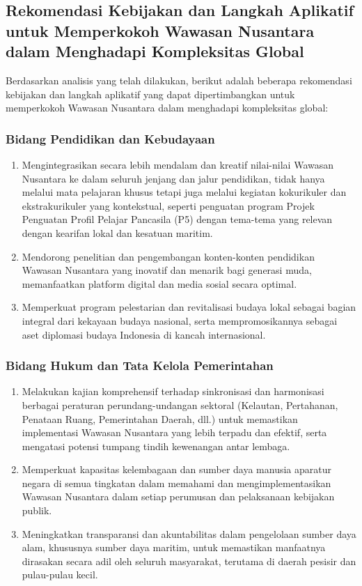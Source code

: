 \documentclass[12pt, a4paper]{article}
\begin{document}
\subsection*{Rekomendasi Kebijakan dan Langkah Aplikatif untuk Memperkokoh Wawasan Nusantara dalam Menghadapi Kompleksitas Global}
Berdasarkan analisis yang telah dilakukan, berikut adalah beberapa rekomendasi kebijakan dan langkah aplikatif yang dapat dipertimbangkan untuk memperkokoh Wawasan Nusantara dalam menghadapi kompleksitas global:
\subsubsection*{Bidang Pendidikan dan Kebudayaan}
\begin{enumerate}
  \item Mengintegrasikan secara lebih mendalam dan kreatif nilai-nilai Wawasan Nusantara ke dalam seluruh jenjang dan jalur pendidikan, tidak hanya melalui mata pelajaran khusus tetapi juga melalui kegiatan kokurikuler dan ekstrakurikuler yang kontekstual, seperti penguatan program Projek Penguatan Profil Pelajar Pancasila (P5) dengan tema-tema yang relevan dengan kearifan lokal dan kesatuan maritim.
  \item Mendorong penelitian dan pengembangan konten-konten pendidikan Wawasan Nusantara yang inovatif dan menarik bagi generasi muda, memanfaatkan platform digital dan media sosial secara optimal.
  \item Memperkuat program pelestarian dan revitalisasi budaya lokal sebagai bagian integral dari kekayaan budaya nasional, serta mempromosikannya sebagai aset diplomasi budaya Indonesia di kancah internasional.
\end{enumerate}
\subsubsection*{Bidang Hukum dan Tata Kelola Pemerintahan}
\begin{enumerate}
  \item Melakukan kajian komprehensif terhadap sinkronisasi dan harmonisasi berbagai peraturan perundang-undangan sektoral (Kelautan, Pertahanan, Penataan Ruang, Pemerintahan Daerah, dll.) untuk memastikan implementasi Wawasan Nusantara yang lebih terpadu dan efektif, serta mengatasi potensi tumpang tindih kewenangan antar lembaga.
  \item Memperkuat kapasitas kelembagaan dan sumber daya manusia aparatur negara di semua tingkatan dalam memahami dan mengimplementasikan Wawasan Nusantara dalam setiap perumusan dan pelaksanaan kebijakan publik.
  \item Meningkatkan transparansi dan akuntabilitas dalam pengelolaan sumber daya alam, khususnya sumber daya maritim, untuk memastikan manfaatnya dirasakan secara adil oleh seluruh masyarakat, terutama di daerah pesisir dan pulau-pulau kecil.
\end{enumerate}
\end{document}
